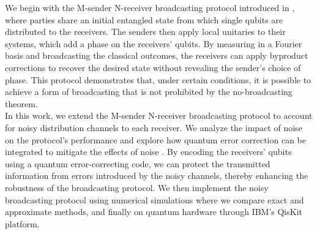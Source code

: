 We begin with the M-sender N-receiver broadcasting protocol introduced in \cite{sukeno2023broadcasting}, where parties share an initial entangled state from which single qubits are distributed to the receivers. The senders then apply local unitaries to their systems, which add a phase on the receivers' qubits. By measuring in a Fourier basis and broadcasting the classical outcomes, the receivers can apply byproduct corrections to recover the desired state without revealing the sender's choice of phase. This protocol demonstrates that, under certain conditions, it is possible to achieve a form of broadcasting that is not prohibited by the no-broadcasting theorem.
\\

In this work, we extend the M-sender N-receiver broadcasting protocol to account for noisy distribution channels to each receiver. We analyze the impact of noise on the protocol's performance and explore how quantum error correction can be integrated to mitigate the effects of noise \cite{knill1997theory}. By encoding the receivers' qubits using a quantum error-correcting code, we can protect the transmitted information from errors introduced by the noisy channels, thereby enhancing the robustness of the broadcasting protocol. We then implement the noisy broadcasting protocol using numerical simulations where we compare exact and approximate methods, and finally on quantum hardware through IBM's QisKit platform.

